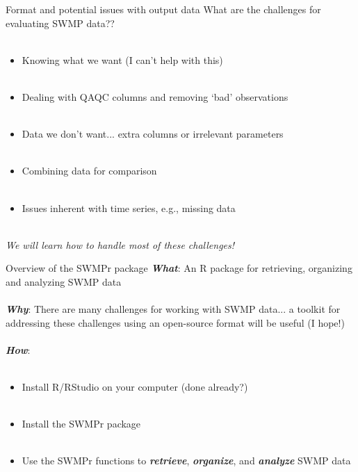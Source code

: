 \documentclass[xcolor=svgnames]{beamer}\usepackage[]{graphicx}\usepackage[]{color}
\newcommand{\Bigtxt}[1]{\textbf{\textit{#1}}}
\begin{document}
\begin{frame}{Format and potential issues with output data}
\onslide<+->
What are the challenges for evaluating SWMP data?? \\~\\
\onslide<+->
\begin{itemize}
\item Knowing what we want (I can't help with this) \\~\\
\onslide<+->
\item Dealing with QAQC columns and removing `bad' observations \\~\\
\onslide<+->
\item Data we don't want... extra columns or irrelevant parameters \\~\\
\onslide<+->
\item Combining data for comparison\\~\\
\onslide<+-> 
\item Issues inherent with time series, e.g., missing data \\~\\
\end{itemize}
\onslide<+->
\centerline{\emph{We will learn how to handle most of these challenges!}}
\end{frame}

\begin{frame}{Overview of the SWMPr package}
\onslide<+->
\textbf{\emph{What}}: An R package for retrieving, organizing and analyzing SWMP data \\~\\
\onslide<+->
\Bigtxt{Why}: There are many challenges for working with SWMP data... a toolkit for addressing these challenges using an open-source format will be useful (I hope!) \\~\\
\onslide<+->
\Bigtxt{How}: \\~\\
\begin{itemize}
\item Install R/RStudio on your computer (done already?) \\~\\
\item Install the SWMPr package \\~\\
\item Use the SWMPr functions to \Bigtxt{retrieve}, \Bigtxt{organize}, and \Bigtxt{analyze} SWMP data 
\end{itemize}
\end{frame}
\end{document}
